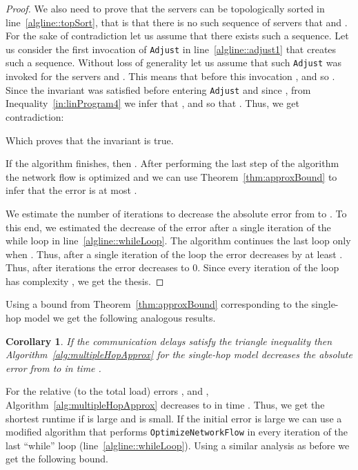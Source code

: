 \documentclass[11pt]{article}
\newtheorem{corollary}[theorem]{Corollary}
\begin{document}
\begin{proof}
We also need to prove that the servers can be topologically sorted in line~\ref{algline::topSort}, that is that there is no such sequence of servers  that  and . For the sake of contradiction let us assume that there exists such a sequence. Let us consider the first invocation of \texttt{Adjust} in line~\ref{algline::adjust1} that creates such a sequence. Without loss of generality let us assume that such \texttt{Adjust} was invoked for the servers  and . This means that before this invocation , and so
.
Since the invariant was satisfied before entering \texttt{Adjust} and since , from Inequality~\ref{in:linProgram4} we infer that
, and so that
. Thus, we get contradiction:

Which proves that the invariant is true.

If the algorithm finishes, then . After performing the last step of the algorithm the network flow is optimized and we can use Theorem~\ref{thm:approxBound} to infer that the error is at most .

We estimate the number of iterations to decrease the absolute error from  to . To this end, we estimated the decrease of the error after a single iteration of the while loop in line~\ref{algline::whileLoop}.
The algorithm continues the last loop only when .
Thus, after a single iteration of the loop the error decreases by at least .
Thus, after  iterations the error decreases to 0. Since every iteration of the loop has complexity , we get the thesis.
\end{proof}

Using a bound from Theorem~\ref{thm:approxBound} corresponding to the single-hop model we get the following analogous results.

\begin{corollary}
If the communication delays satisfy the triangle inequality then Algorithm~\ref{alg:multipleHopApprox} for the single-hop model decreases the absolute error from  to  in time .
\end{corollary}

For the relative (to the total load) errors , and , Algorithm~\ref{alg:multipleHopApprox} decreases  to  in time . Thus, we get the shortest runtime if  is large and  is small. If the initial error  is large we can use a modified algorithm that performs \texttt{OptimizeNetworkFlow} in every iteration of the last ``while'' loop (line~\ref{algline::whileLoop}). Using a similar analysis as before we get the following bound.
\end{document}
